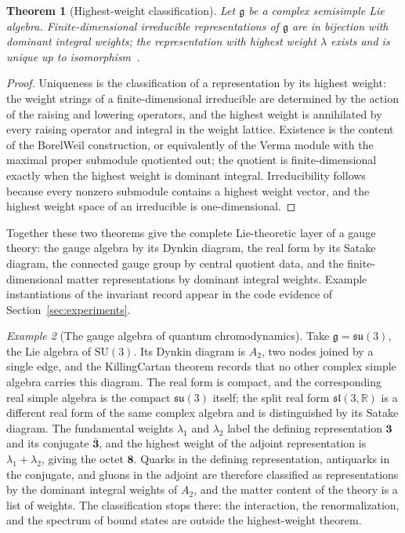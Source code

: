 \documentclass[11pt,letterpaper]{article}
\newtheorem{theorem}{Theorem}[section]
\theoremstyle{definition}
\theoremstyle{remark}
\newtheorem{example}[theorem]{Example}
\begin{document}
\begin{theorem}[Highest-weight classification]
\label{thm:highest-weight}
Let $\mathfrak{g}$ be a complex semisimple Lie algebra. Finite-dimensional irreducible representations of $\mathfrak{g}$ are in bijection with dominant integral weights; the representation with highest weight $\lambda$ exists and is unique up to isomorphism~\cite{humphreys}.
\end{theorem}

\begin{proof}
Uniqueness is the classification of a representation by its highest weight: the weight strings of a finite-dimensional irreducible are determined by the action of the raising and lowering operators, and the highest weight is annihilated by every raising operator and integral in the weight lattice. Existence is the content of the Borel\textendash{}Weil construction, or equivalently of the Verma module with the maximal proper submodule quotiented out; the quotient is finite-dimensional exactly when the highest weight is dominant integral. Irreducibility follows because every nonzero submodule contains a highest weight vector, and the highest weight space of an irreducible is one-dimensional.
\end{proof}

Together these two theorems give the complete Lie-theoretic layer of a gauge theory: the gauge algebra by its Dynkin diagram, the real form by its Satake diagram, the connected gauge group by central quotient data, and the finite-dimensional matter representations by dominant integral weights. Example instantiations of the invariant record appear in the code evidence of Section~\ref{sec:experiments}.

\begin{example}[The gauge algebra of quantum chromodynamics]
\label{ex:su3}
Take $\mathfrak{g} = \mathfrak{su}(3)$, the Lie algebra of $\mathrm{SU}(3)$. Its Dynkin diagram is $A_2$, two nodes joined by a single edge, and the Killing\textendash{}Cartan theorem records that no other complex simple algebra carries this diagram. The real form is compact, and the corresponding real simple algebra is the compact $\mathfrak{su}(3)$ itself; the split real form $\mathfrak{sl}(3, \mathbb{R})$ is a different real form of the same complex algebra and is distinguished by its Satake diagram. The fundamental weights $\lambda_1$ and $\lambda_2$ label the defining representation $\mathbf{3}$ and its conjugate $\bar{\mathbf{3}}$, and the highest weight of the adjoint representation is $\lambda_1 + \lambda_2$, giving the octet $\mathbf{8}$. Quarks in the defining representation, antiquarks in the conjugate, and gluons in the adjoint are therefore classified as representations by the dominant integral weights of $A_2$, and the matter content of the theory is a list of weights. The classification stops there: the interaction, the renormalization, and the spectrum of bound states are outside the highest-weight theorem.
\end{example}
\end{document}
